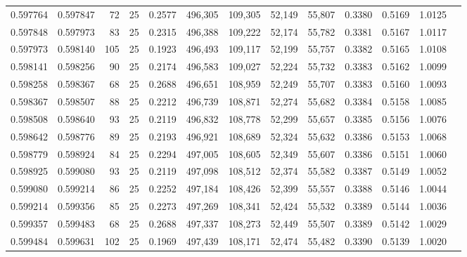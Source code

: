 \begin{tabular}{rrrrrrrrrrrrr}
0.597764 & 0.597847 &    72 &  25 &                                     0.2577 & 496,305 & 109,305 &  52,149 &  55,807 & 0.3380 & 0.5169 & 1.0125 \\
0.597848 & 0.597973 &    83 &  25 &                                     0.2315 & 496,388 & 109,222 &  52,174 &  55,782 & 0.3381 & 0.5167 & 1.0117 \\
0.597973 & 0.598140 &   105 &  25 &                                     0.1923 & 496,493 & 109,117 &  52,199 &  55,757 & 0.3382 & 0.5165 & 1.0108 \\
0.598141 & 0.598256 &    90 &  25 &                                     0.2174 & 496,583 & 109,027 &  52,224 &  55,732 & 0.3383 & 0.5162 & 1.0099 \\
0.598258 & 0.598367 &    68 &  25 &                                     0.2688 & 496,651 & 108,959 &  52,249 &  55,707 & 0.3383 & 0.5160 & 1.0093 \\
0.598367 & 0.598507 &    88 &  25 &                                     0.2212 & 496,739 & 108,871 &  52,274 &  55,682 & 0.3384 & 0.5158 & 1.0085 \\
0.598508 & 0.598640 &    93 &  25 &                                     0.2119 & 496,832 & 108,778 &  52,299 &  55,657 & 0.3385 & 0.5156 & 1.0076 \\
0.598642 & 0.598776 &    89 &  25 &                                     0.2193 & 496,921 & 108,689 &  52,324 &  55,632 & 0.3386 & 0.5153 & 1.0068 \\
0.598779 & 0.598924 &    84 &  25 &                                     0.2294 & 497,005 & 108,605 &  52,349 &  55,607 & 0.3386 & 0.5151 & 1.0060 \\
0.598925 & 0.599080 &    93 &  25 &                                     0.2119 & 497,098 & 108,512 &  52,374 &  55,582 & 0.3387 & 0.5149 & 1.0052 \\
0.599080 & 0.599214 &    86 &  25 &                                     0.2252 & 497,184 & 108,426 &  52,399 &  55,557 & 0.3388 & 0.5146 & 1.0044 \\
0.599214 & 0.599356 &    85 &  25 &                                     0.2273 & 497,269 & 108,341 &  52,424 &  55,532 & 0.3389 & 0.5144 & 1.0036 \\
0.599357 & 0.599483 &    68 &  25 &                                     0.2688 & 497,337 & 108,273 &  52,449 &  55,507 & 0.3389 & 0.5142 & 1.0029 \\
0.599484 & 0.599631 &   102 &  25 &                                     0.1969 & 497,439 & 108,171 &  52,474 &  55,482 & 0.3390 & 0.5139 & 1.0020 \\

\end{tabular}
